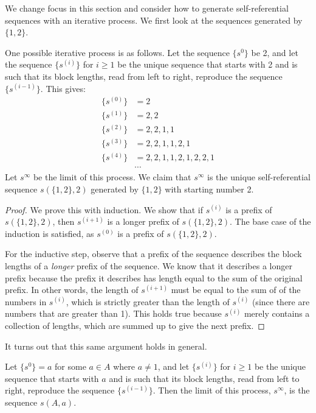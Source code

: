 \documentclass[runningheads,a4paper]{llncs}
\begin{document}
We change focus in this section and consider how to generate self-referential sequences with an iterative process. We first look at the sequences generated by $\{1,2\}$.

One possible iterative process is as follows. Let the sequence $\{s^0\}$ be 2, and let the sequence $\{s^{(i)}\}$ for $i \geq 1$ be the unique sequence that starts with 2 and is such that its block lengths, read from left to right, reproduce the sequence $\{s^{(i-1)}\}$. This gives:
\begin{align*}
\{s^{(0)}\} &= 2\\
\{s^{(1)}\} &= 2,2\\
\{s^{(2)}\} &= 2,2,1,1\\
\{s^{(3)}\} &= 2,2,1,1,2,1\\
\{s^{(4)}\} &= 2,2,1,1,2,1,2,2,1\\
&\cdots
\end{align*}
Let $s^\infty$ be the limit of this process. We claim that $s^\infty$ is the unique self-referential sequence $s(\{1,2\},2)$ generated by $\{1,2\}$ with starting number 2.
\begin{proof}
We prove this with induction. We show that if $s^{(i)}$ is a prefix of $s(\{1,2\},2)$, then $s^{(i+1)}$ is a longer prefix of $s(\{1,2\},2)$. The base case of the induction is satisfied, as $s^{(0)}$ is a prefix of $s(\{1,2\},2)$.

For the inductive step, observe that a prefix of the sequence describes the block lengths of a \emph{longer} prefix of the sequence. We know that it describes a longer prefix because the prefix it describes has length equal to the sum of the original prefix. In other words, the length of $s^{(i+1)}$ must be equal to the sum of of the numbers in $s^{(i)}$, which is strictly greater than the length of $s^{(i)}$ (since there are numbers that are greater than 1). This holds true because $s^{(i)}$ merely contains a collection of lengths, which are summed up to give the next prefix. 
\end{proof}

It turns out that this same argument holds in general.

\begin{theorem}
Let $\{s^0\} = a$ for some $a \in A$ where $a \neq 1$, and let $\{s^{(i)}\}$ for $i \geq 1$ be the unique sequence that starts with $a$ and is such that its block lengths, read from left to right, reproduce the sequence $\{s^{(i-1)}\}$. Then the limit of this process, $s^\infty$, is the sequence $s(A,a)$.
\end{theorem}
\end{document}
